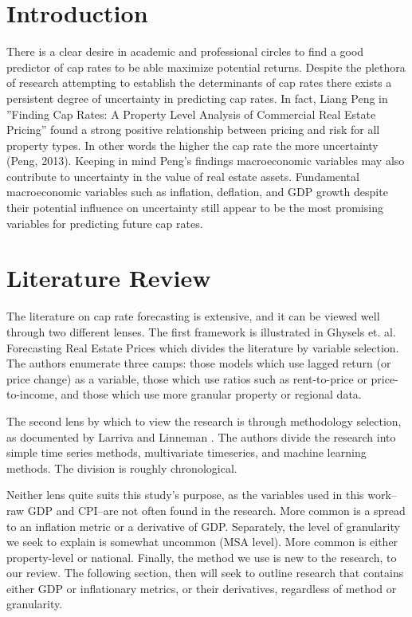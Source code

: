 \section{Introduction}
There is a clear desire in academic and professional circles to find a good predictor of cap rates to be able maximize potential returns. Despite the plethora of research attempting to establish the determinants of cap rates there exists a persistent degree of uncertainty in predicting cap rates. In fact, Liang Peng in ”Finding Cap Rates: A Property Level Analysis of Commercial Real Estate Pricing” found a strong positive relationship between pricing and risk for all property types. In other words the higher the cap rate the more uncertainty (Peng, 2013). Keeping in mind Peng’s findings macroeconomic variables may also contribute to uncertainty in the value of real estate assets. Fundamental macroeconomic variables such as inflation, deflation, and GDP growth despite their potential influence on uncertainty still appear to be the most promising variables for predicting future cap rates.

\label{intro}


\section{Literature Review}

The literature on cap rate forecasting is extensive, and it can be viewed well through two different lenses. The first framework is illustrated in Ghysels et. al. Forecasting Real Estate Prices \citep*{ghysels_plazzi_valkanov_torous_2013} which divides the literature by variable selection. The authors enumerate three camps: those models which use lagged return (or price change) as a variable, those which use ratios such as rent-to-price or price-to-income, and those which use more granular property or regional data. 

The second lens by which to view the research is through methodology selection, as documented by Larriva and Linneman \citep*{larriva2021determinants}. The authors divide the research into simple time series methods, multivariate timeseries, and machine learning methods. The division is roughly chronological. 

Neither lens quite suits this study's purpose, as the variables used in this work--raw GDP and CPI--are not often found in the research. More common is a spread to an inflation metric or a derivative of GDP. Separately, the level of granularity we seek to explain is somewhat uncommon (MSA level). More common is either property-level or national. Finally, the method we use is new to the research, to our review. The following section, then will seek to outline research that contains either GDP or inflationary metrics, or their derivatives, regardless of method or granularity.

